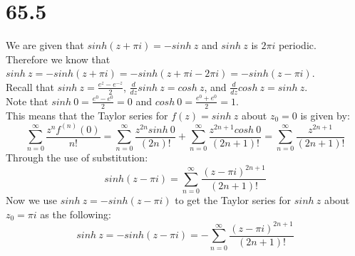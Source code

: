 \documentclass{article}
\begin{document}
\newpage
\section*{65.5}
\begin{center}
    \doublespacing
    We are given that $sinh(z +\pi i) = -sinh\:z$ and $sinh\:z$ is $2\pi i$ periodic.
    \\Therefore we know that $sinh\:z = -sinh(z +\pi i) = -sinh(z +\pi i - 2\pi i) = -sinh(z -\pi i)$.
    \\Recall that $sinh\:z =\frac{e^z - e^{-z}}{2}$, $\frac{d}{dz} sinh\:z = cosh\:z$, and $\frac{d}{dz} cosh\:z = sinh\:z$.
    \\Note that $sinh\:0 =\frac{e^0 - e^0}{2} = 0$ and $cosh\:0 =\frac{e^0 + e^0}{2} = 1$.
    \\This means that the Taylor series for $f(z) = sinh\:z$ about $z_0 = 0$ is given by:
    \[\sum _{n=0}^{\infty}\frac{z^n f^{(n)} (0)}{n!} =\sum _{n=0}^{\infty}\frac{z^{2n} sinh\:0}{(2n)!} +\sum _{n=0}^{\infty}\frac{z^{2n + 1} cosh\:0}{(2n + 1)!} =\sum _{n=0}^{\infty}\frac{z^{2n + 1}}{(2n + 1)!}\]
    Through the use of substitution:
    \[sinh(z -\pi i) =\sum _{n=0}^{\infty}\frac{(z -\pi i)^{2n + 1}}{(2n + 1)!}\]
    Now we use $sinh\:z = -sinh(z -\pi i)$ to get the Taylor series for $sinh\:z$ about $z_0 =\pi i$ as the following:
    \[sinh\:z = -sinh(z -\pi i) = -\sum _{n=0}^{\infty}\frac{(z -\pi i)^{2n + 1}}{(2n + 1)!}\]
\end{center}
\end{document}
